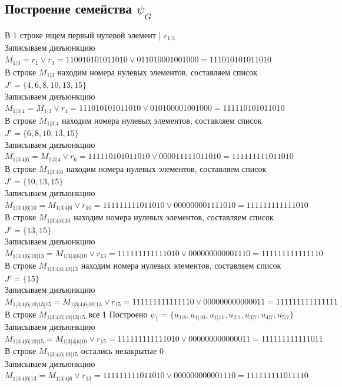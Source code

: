 \documentclass[12pt,a4paper]{report}
\begin{document}
\subsection*{Построение семейства $\psi_G$}
В 1 строке ищем первый нулевой элемент | $r_{1 | 3}$ \\
Записываем дизъюнкцию $M_{1 | 3} = r_{1}\vee r_{3} = 110010101011010 \vee 011010001001000 = 111010101011010$ \\
В строке $M_{1 | 3}$ находим номера нулевых элементов, составляем список $J' = \{4, 6, 8, 10, 13, 15\}$ \\
Записываем дизъюнкцию $M_{1 | 3 | 4} = M_{1 | 3}\vee r_{4} = 111010101011010 \vee 010100001001000 = 111110101011010$ \\
В строке $M_{1 | 3 | 4}$ находим номера нулевых элементов, составляем список $J' = \{6, 8, 10, 13, 15\}$ \\
Записываем дизъюнкцию $M_{1 | 3 | 4 | 6} = M_{1 | 3 | 4}\vee r_{6} = 111110101011010 \vee 000011111011010 = 111111111011010$ \\
В строке $M_{1 | 3 | 4 | 6}$ находим номера нулевых элементов, составляем список $J' = \{10, 13, 15\}$ \\
Записываем дизъюнкцию $M_{1 | 3 | 4 | 6 | 10} = M_{1 | 3 | 4 | 6}\vee r_{10} = 111111111011010 \vee 000000001111010 = 111111111111010$ \\
В строке $M_{1 | 3 | 4 | 6 | 10}$ находим номера нулевых элементов, составляем список $J' = \{13, 15\}$ \\
Записываем дизъюнкцию $M_{1 | 3 | 4 | 6 | 10 | 13} = M_{1 | 3 | 4 | 6 | 10}\vee r_{13} = 111111111111010 \vee 000000000001110 = 111111111111110$ \\
В строке $M_{1 | 3 | 4 | 6 | 10 | 13}$ находим номера нулевых элементов, составляем список $J' = \{15\}$ \\
Записываем дизъюнкцию $M_{1 | 3 | 4 | 6 | 10 | 13 | 15} = M_{1 | 3 | 4 | 6 | 10 | 13}\vee r_{15} = 111111111111110 \vee 000000000000011 = 111111111111111$ \\
В строке $M_{1 | 3 | 4 | 6 | 10 | 13 | 15}$ все 1 Построено $\psi_{1} = \{u_{1 | 8},u_{1 | 10},u_{1 | 11},u_{2 | 7},u_{3 | 7},u_{4 | 7},u_{5 | 7}\}$ \\
Записываем дизъюнкцию $M_{1 | 3 | 4 | 6 | 10 | 15} = M_{1 | 3 | 4 | 6 | 10}\vee r_{15} = 111111111111010 \vee 000000000000011 = 111111111111011$ \\
В строке $M_{1 | 3 | 4 | 6 | 10 | 15}$ остались незакрытые $0$ \\
Записываем дизъюнкцию $M_{1 | 3 | 4 | 6 | 13} = M_{1 | 3 | 4 | 6}\vee r_{13} = 111111111011010 \vee 000000000001110 = 111111111011110$ \\
\end{document}
